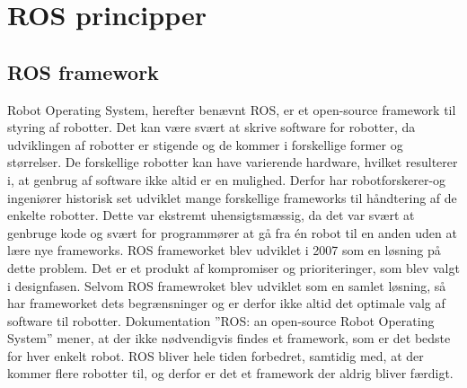 \chapter{ROS principper}\label{app:ROSPrincipper}
\section{ROS framework}
Robot Operating System, herefter benævnt ROS, er et open-source framework til styring af robotter.
Det kan være svært at skrive software for robotter, da udviklingen af robotter er stigende og de kommer i forskellige former og størrelser.
De forskellige robotter kan have varierende hardware, hvilket resulterer i, at genbrug af software ikke altid er en mulighed.
Derfor har robotforskerer-og ingeniører historisk set udviklet mange forskellige frameworks til håndtering af de enkelte robotter.
Dette var ekstremt uhensigtsmæssig, da det var svært at genbruge kode og svært for programmører at gå fra én robot til en anden uden at lære nye frameworks.
ROS frameworket blev udviklet i 2007 som en løsning på dette problem. Det er et produkt af kompromiser og prioriteringer, som blev valgt i designfasen.
Selvom ROS framewroket blev udviklet som en samlet løsning, så har frameworket dets begrænsninger og er derfor ikke altid det optimale valg af software til robotter.
Dokumentation ''ROS: an open-source Robot Operating System'' mener, at der ikke nødvendigvis findes et framework, som er det bedste for hver enkelt robot.
ROS bliver hele tiden forbedret, samtidig med, at der kommer flere robotter til, og derfor er det et framework der aldrig bliver færdigt.

